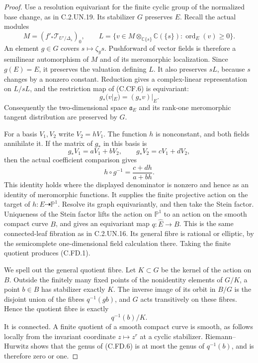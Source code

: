 \begin{proof}
Use a resolution equivariant for the finite cyclic group of the
normalized base change, as in C.2.UN.19. Its stabilizer $G$
preserves $E$. Recall the actual modules
\[
 M=(f'_*\mathcal T_{U'/\Delta_s})_0,
 \qquad
 L=\{v\in M\otimes_{\mathbb C\{s\}}\mathbb C(\{s\}):
                  \operatorname{ord}_E(v)\ge0\}.
                                                               \tag{C.FD.3}
\]
An element $g\in G$ covers $s\mapsto\zeta_gs$. Pushforward of
vector fields is therefore a semilinear automorphism of $M$
and of its meromorphic localization. Since $g(E)=E$, it
preserves the valuation defining $L$. It also preserves $sL$,
because $s$ changes by a nonzero constant. Reduction gives
a complex-linear representation on $L/sL$, and the restriction
map of (C.CF.6) is equivariant:
\[
 g_*\bigl(v|_E\bigr)=(g_*v)|_E.
                                                               \tag{C.FD.4}
\]
Consequently the two-dimensional space $\mathfrak a_E$ and
its rank-one meromorphic tangent distribution are preserved
by $G$.

For a basis $V_1,V_2$ write $V_2=hV_1$. The function $h$ is
nonconstant, and both fields annihilate it. If the matrix of
$g_*$ in this basis is
\[
       g_*V_1=aV_1+bV_2,\qquad
       g_*V_2=cV_1+dV_2,
\]
then the actual coefficient comparison gives
\[
              h\circ g^{-1}=\frac{c+dh}{a+bh}.
                                                               \tag{C.FD.5}
\]
This identity holds where the displayed denominator is nonzero
and hence as an identity of meromorphic functions. It supplies
the finite projective action on the target of
$h:E\dashrightarrow\mathbb P^1$. Resolve its graph
equivariantly, and then take the Stein factor. Uniqueness of
the Stein factor lifts the action on $\mathbb P^1$ to an action
on the smooth compact curve $B$, and gives an equivariant map
$q:\widehat E\to B$. This is the same connected-leaf
fibration as in C.2.UN.16. Its general fibre is rational or
elliptic, by the semicomplete one-dimensional field calculation
there. Taking the finite quotient produces (C.FD.1).

We spell out the general quotient fibre. Let
$K\subset G$ be the kernel of the action on $B$. Outside
the finitely many fixed points of the nonidentity elements
of $G/K$, a point $b\in B$ has stabilizer exactly $K$.
The inverse image of its orbit in $B/G$ is the disjoint union
of the fibres $q^{-1}(gb)$, and $G$ acts transitively on these
fibres. Hence the quotient fibre is exactly
\[
                       q^{-1}(b)/K.
                                                               \tag{C.FD.6}
\]
It is connected. A finite quotient of a smooth compact curve
is smooth, as follows locally from the invariant coordinate
$z\mapsto z^r$ at a cyclic stabilizer. Riemann--Hurwitz
shows that the genus of (C.FD.6) is at most the genus of
$q^{-1}(b)$, and is therefore zero or one.


\end{proof}
